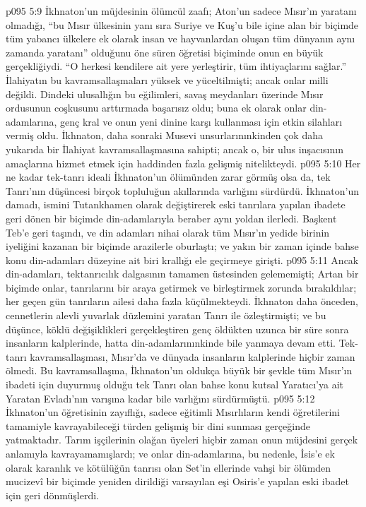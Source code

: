 \vs p095 5:9 İkhnaton’un müjdesinin ölümcül zaafı; Aton’un sadece Mısır’ın yaratanı olmadığı, “bu Mısır ülkesinin yanı sıra Suriye ve Kuş’u bile içine alan bir biçimde tüm yabancı ülkelere ek olarak insan ve hayvanlardan oluşan tüm dünyanın aynı zamanda yaratanı” olduğunu öne süren öğretisi biçiminde onun en büyük gerçekliğiydi. “O herkesi kendilere ait yere yerleştirir, tüm ihtiyaçlarını sağlar.” İlahiyatın bu kavramsallaşmaları yüksek ve yüceltilmişti; ancak onlar milli değildi. Dindeki ulusallığın bu eğilimleri, savaş meydanları üzerinde Mısır ordusunun coşkusunu arttırmada başarısız oldu; buna ek olarak onlar din\hyp{}adamlarına, genç kral ve onun yeni dinine karşı kullanması için etkin silahları vermiş oldu. İkhnaton, daha sonraki Musevi unsurlarınınkinden çok daha yukarıda bir İlahiyat kavramsallaşmasına sahipti; ancak o, bir ulus inşacısının amaçlarına hizmet etmek için haddinden fazla gelişmiş nitelikteydi.
\vs p095 5:10 Her ne kadar tek\hyp{}tanrı ideali İkhnaton’un ölümünden zarar görmüş olsa da, tek Tanrı’nın düşüncesi birçok topluluğun akıllarında varlığını sürdürdü. İkhnaton’un damadı, ismini Tutankhamen olarak değiştirerek eski tanrılara yapılan ibadete geri dönen bir biçimde din\hyp{}adamlarıyla beraber aynı yoldan ilerledi. Başkent Teb’e geri taşındı, ve din adamları nihai olarak tüm Mısır’ın yedide birinin iyeliğini kazanan bir biçimde arazilerle oburlaştı; ve yakın bir zaman içinde bahse konu din\hyp{}adamları düzeyine ait biri krallığı ele geçirmeye girişti.
\vs p095 5:11 Ancak din\hyp{}adamları, tektanrıcılık dalgasının tamamen üstesinden gelememişti; Artan bir biçimde onlar, tanrılarını bir araya getirmek ve birleştirmek zorunda bırakıldılar; her geçen gün tanrıların ailesi daha fazla küçülmekteydi. İkhnaton daha önceden, cennetlerin alevli yuvarlak düzlemini yaratan Tanrı ile özleştirmişti; ve bu düşünce, köklü değişiklikleri gerçekleştiren genç öldükten uzunca bir süre sonra insanların kalplerinde, hatta din\hyp{}adamlarınınkinde bile yanmaya devam etti. Tek\hyp{}tanrı kavramsallaşması, Mısır’da ve dünyada insanların kalplerinde hiçbir zaman ölmedi. Bu kavramsallaşma, İkhnaton’un oldukça büyük bir şevkle tüm Mısır’ın ibadeti için duyurmuş olduğu tek Tanrı olan bahse konu kutsal Yaratıcı’ya ait Yaratan Evladı’nın varışına kadar bile varlığını sürdürmüştü.
\vs p095 5:12 İkhnaton’un öğretisinin zayıflığı, sadece eğitimli Mısırlıların kendi öğretilerini tamamiyle kavrayabileceği türden gelişmiş bir dini sunması gerçeğinde yatmaktadır. Tarım işçilerinin olağan üyeleri hiçbir zaman onun müjdesini gerçek anlamıyla kavrayamamışlardı; ve onlar din\hyp{}adamlarına, bu nedenle, İsis’e ek olarak karanlık ve kötülüğün tanrısı olan Set’in ellerinde vahşi bir ölümden mucizevî bir biçimde yeniden dirildiği varsayılan eşi Osiris’e yapılan eski ibadet için geri dönmüşlerdi.
